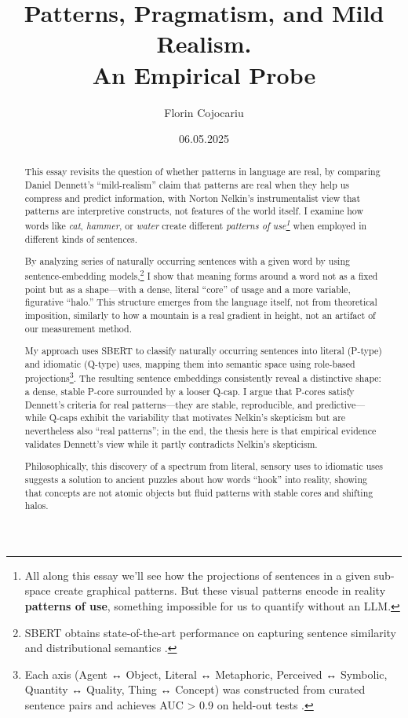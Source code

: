 \documentclass[12pt]{article}
\title{Patterns, Pragmatism, and Mild Realism. \\[0.5em] \large An Empirical Probe}
\author{Florin Cojocariu}
\date{06.05.2025}
\begin{document}
\maketitle

\begin{abstract}
This essay revisits the question of whether patterns in language are real, by comparing Daniel Dennett's ``mild-realism'' claim that patterns are real when they help us compress and predict information, with Norton Nelkin's instrumentalist view that patterns are interpretive constructs, not features of the world itself. I examine how words like \emph{cat}, \emph{hammer}, or \emph{water} create different \emph{patterns of use\footnote{All along this essay we'll see how the projections of sentences in a given sub-space create graphical patterns. But these visual patterns encode in reality \textbf{patterns of use}, something impossible for us to quantify without an LLM.}} when employed in different kinds of sentences.

By analyzing series of naturally occurring sentences with a given word by using sentence-embedding models,\footnote{SBERT obtains state-of-the-art performance on capturing sentence similarity and distributional semantics \cite{ref-milliereBuckner2024}.} I show that meaning forms around a word not as a fixed point but as a shape---with a dense, literal ``core'' of usage and a more variable, figurative ``halo.'' This structure emerges from the language itself, not from theoretical imposition, similarly to how a mountain is a real gradient in height, not an artifact of our measurement method.

My approach uses SBERT to classify naturally occurring sentences into literal (P-type) and idiomatic (Q-type) uses, mapping them into semantic space using role-based projections\footnote{Each axis (Agent ↔ Object, Literal ↔ Metaphoric, Perceived ↔ Symbolic, Quantity ↔ Quality, Thing ↔ Concept) was constructed from curated sentence pairs and achieves AUC \textgreater{} 0.9 on held-out tests \cite{ref-milliereBuckner2024}.}. The resulting sentence embeddings consistently reveal a distinctive shape: a dense, stable P-core surrounded by a looser Q-cap. I argue that P-cores satisfy Dennett's criteria for real patterns---they are stable, reproducible, and predictive---while Q-caps exhibit the variability that motivates Nelkin's skepticism but are nevertheless also ``real patterns''; in the end, the thesis here is that empirical evidence validates Dennett's view while it partly contradicts Nelkin's skepticism.

Philosophically, this discovery of a spectrum from literal, sensory uses to idiomatic uses suggests a solution to ancient puzzles about how words ``hook'' into reality, showing that concepts are not atomic objects but fluid patterns with stable cores and shifting halos.
\end{abstract}
\vspace{1em}
\end{document}
